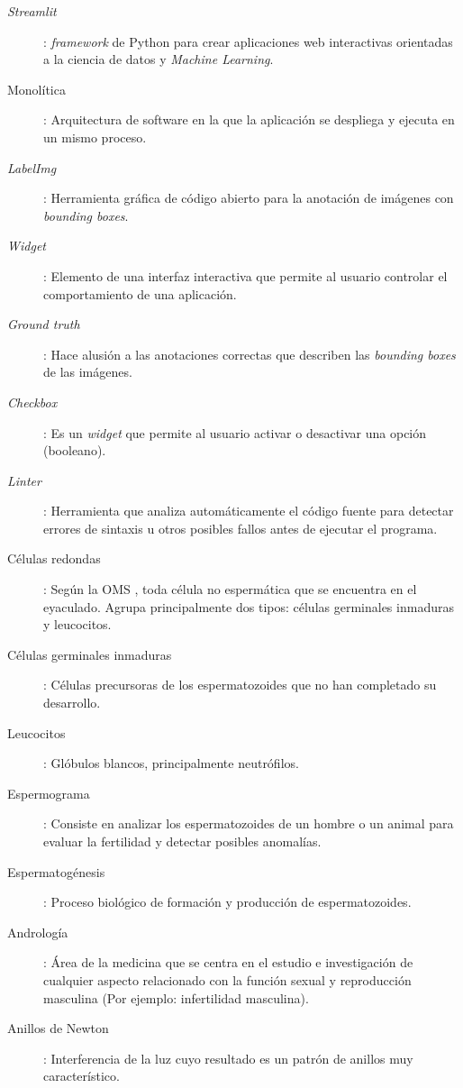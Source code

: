 \documentclass[12pt,a4paper,onecolumn,oneside]{report}
\begin{document}
\begin{description}
  \item[\textit{Streamlit}]: \textit{framework} de Python para crear aplicaciones web interactivas orientadas a la ciencia de datos y \textit{Machine Learning}.
  \item[Monolítica]: Arquitectura de software en la que la aplicación se despliega y ejecuta en un mismo proceso.     
  \item[\textit{LabelImg}]: Herramienta gráfica de código abierto para la anotación de imágenes con \textit{bounding boxes}.
  \item[\textit{Widget}]: Elemento de una interfaz interactiva que permite al usuario controlar el comportamiento de una aplicación.
  \item[\textit{Ground truth}]: Hace alusión a las anotaciones correctas que describen las \textit{bounding boxes} de las imágenes.
  \item[\textit{Checkbox}]: Es un \textit{widget} que permite al usuario activar o desactivar una opción (booleano).  
  \item[\textit{Linter}]:  Herramienta que analiza automáticamente el código fuente para detectar errores de sintaxis u otros posibles fallos antes de ejecutar el programa. 
  \item[Células redondas]: Según la OMS \cite{OMS}, toda célula no espermática que se encuentra en el eyaculado. Agrupa principalmente dos tipos: células germinales inmaduras y leucocitos.
  \item[Células germinales inmaduras]: Células precursoras de los espermatozoides que no han completado su desarrollo.
  \item[Leucocitos]: Glóbulos blancos, principalmente neutrófilos.  
  \item[Espermograma]: Consiste en analizar los espermatozoides de un hombre o un animal para evaluar la fertilidad y detectar posibles anomalías. 
  \item[Espermatogénesis]: Proceso biológico de formación y producción de espermatozoides.
  \item[Andrología]: Área de la medicina que se centra en el estudio e investigación de cualquier aspecto relacionado con la función sexual y reproducción masculina (Por ejemplo: infertilidad masculina).  
  \item[Anillos de Newton]: Interferencia de la luz cuyo resultado es un patrón de anillos muy característico.

\end{description}
\end{document}
